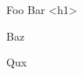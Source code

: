 \documentclass{article}
\begin{document}
\begin{html}
  Foo Bar <h1> \par
  Baz \par
  Qux
\end{html}
\end{document}
